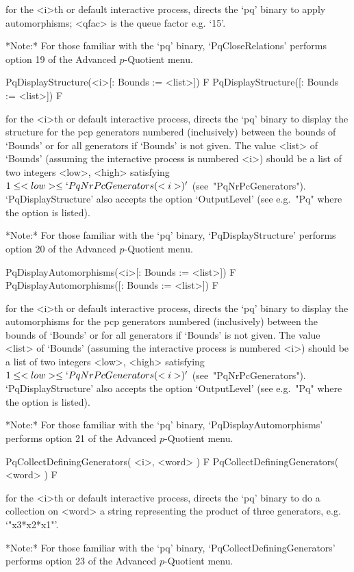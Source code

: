 for the <i>th or default interactive {\ANUPQ} process, directs  the  `pq'
binary to apply automorphisms; <qfac> is the queue factor e.g. `15'.

*Note:* 
For those familiar with  the  `pq'  binary,  `PqCloseRelations'  performs
option 19 of the Advanced $p$-Quotient menu.

\>PqDisplayStructure(<i>[: Bounds := <list>]) F
\>PqDisplayStructure([: Bounds := <list>]) F

for the <i>th or default interactive {\ANUPQ} process, directs  the  `pq'
binary  to  display  the  structure  for  the  pcp  generators   numbered
(inclusively) between the bounds of `Bounds' or  for  all  generators  if
`Bounds' is not  given.  The  value  <list>  of  `Bounds'  (assuming  the
interactive process is numbered <i>) should be a  list  of  two  integers
<low>,  <high>  satisfying  $1  \le  <low>  \le  `PqNrPcGenerators(<i>)'$
(see~"PqNrPcGenerators"). `PqDisplayStructure' also  accepts  the  option
`OutputLevel' (see e.g.~"Pq" where the option is listed).

*Note:*
For those familiar with the `pq'  binary,  `PqDisplayStructure'  performs
option 20 of the Advanced $p$-Quotient menu.

\>PqDisplayAutomorphisms(<i>[: Bounds := <list>]) F
\>PqDisplayAutomorphisms([: Bounds := <list>]) F

for the <i>th or default interactive {\ANUPQ} process, directs  the  `pq'
binary to display the  automorphisms  for  the  pcp  generators  numbered
(inclusively) between the bounds of `Bounds' or  for  all  generators  if
`Bounds' is not  given.  The  value  <list>  of  `Bounds'  (assuming  the
interactive process is numbered <i>) should be a  list  of  two  integers
<low>,  <high>  satisfying  $1  \le  <low>  \le  `PqNrPcGenerators(<i>)'$
(see~"PqNrPcGenerators"). `PqDisplayStructure' also  accepts  the  option
`OutputLevel' (see e.g.~"Pq" where the option is listed).

*Note:*
For  those  familiar  with  the  `pq'  binary,   `PqDisplayAutomorphisms'
performs option 21 of the Advanced $p$-Quotient menu.

\>PqCollectDefiningGenerators( <i>, <word> ) F
\>PqCollectDefiningGenerators( <word> ) F

for the <i>th or default interactive {\ANUPQ} process, directs  the  `pq'
binary to do a collection on <word> a string representing the product  of
three generators, e.g. `"x3*x2*x1"'.

*Note:*
For those familiar with the  `pq'  binary,  `PqCollectDefiningGenerators'
performs option 23 of the Advanced $p$-Quotient menu.

